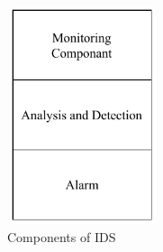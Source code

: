 \begin{figure}[tp]
\center	
\includegraphics[width=1.75in, height=2.5in] {Figures/PDF/IDS-Components.pdf}
\caption{Components of IDS}
\label{IDS-Component}	
\end{figure}
\par

